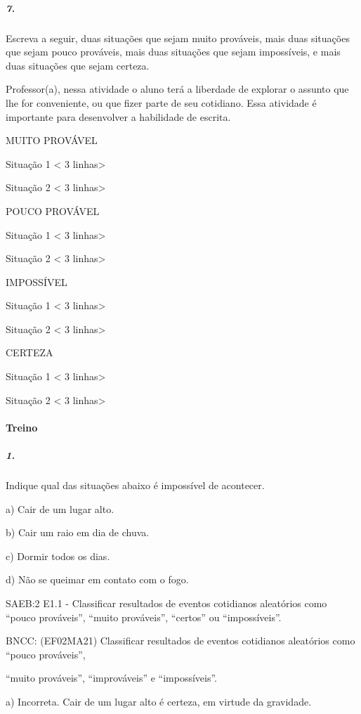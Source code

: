 \subparagraph{7.}\label{section-74}

Escreva a seguir, duas situações que sejam muito prováveis, mais duas
situações que sejam pouco prováveis, mais duas situações que sejam
impossíveis, e mais duas situações que sejam certeza.

Professor(a), nessa atividade o aluno terá a liberdade de explorar o
assunto que lhe for conveniente, ou que fizer parte de seu cotidiano.
Essa atividade é importante para desenvolver a habilidade de escrita.

MUITO PROVÁVEL

Situação 1 \textless{} 3 linhas\textgreater{}

Situação 2 \textless{} 3 linhas\textgreater{}

POUCO PROVÁVEL

Situação 1 \textless{} 3 linhas\textgreater{}

Situação 2 \textless{} 3 linhas\textgreater{}

IMPOSSÍVEL

Situação 1 \textless{} 3 linhas\textgreater{}

Situação 2 \textless{} 3 linhas\textgreater{}

CERTEZA

Situação 1 \textless{} 3 linhas\textgreater{}

Situação 2 \textless{} 3 linhas\textgreater{}

\paragraph{Treino}\label{treino-5}

\subparagraph{1.}\label{section-75}

Indique qual das situações abaixo é impossível de acontecer.

a) Cair de um lugar alto.

b) Cair um raio em dia de chuva.

c) Dormir todos os dias.

d) Não se queimar em contato com o fogo.

SAEB:2 E1.1 - Classificar resultados de eventos cotidianos aleatórios
como ``pouco prováveis'', ``muito prováveis'', ``certos'' ou
``impossíveis''.

BNCC: (EF02MA21) Classificar resultados de eventos cotidianos aleatórios
como ``pouco prováveis'',

``muito prováveis'', ``improváveis'' e ``impossíveis''.

a) Incorreta. Cair de um lugar alto é certeza, em virtude da gravidade.


